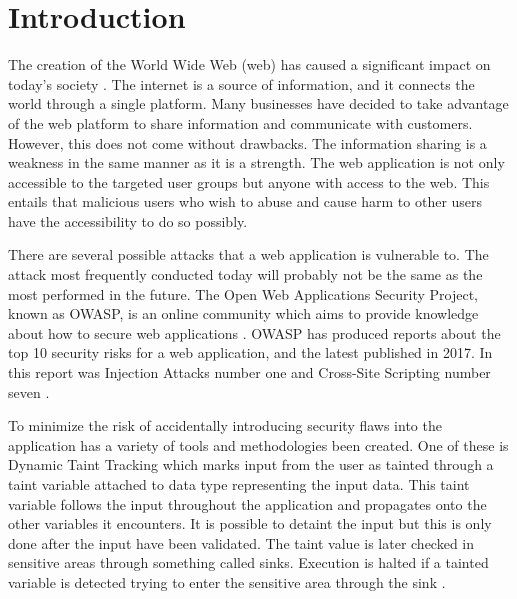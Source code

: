 \chapter{Introduction}
\label{Introduction}
The creation of the World Wide Web (web) has caused a significant impact on today's society \parencite{www}. The internet is a source of information, and it connects the world through a single platform. Many businesses have decided to take advantage of the web platform to share information and communicate with customers. However, this does not come without drawbacks. The information sharing is a weakness in the same manner as it is a strength. The web application is not only accessible to the targeted user groups but anyone with access to the web. This entails that malicious users who wish to abuse and cause harm to other users have the accessibility to do so possibly.

There are several possible attacks that a web application is vulnerable to. The attack most frequently conducted today will probably not be the same as the most performed in the future. The Open Web Applications Security Project, known as OWASP, is an online community which aims to provide knowledge about how to secure web applications \parencite{OpenWebApplicationSecurityProject}. OWASP has produced reports about the top 10 security risks for a web application, and the latest published in 2017. In this report was Injection Attacks number one and Cross-Site Scripting number seven \parencite{OWASP2017, OpenWebApplicationSecurityProject, CrossMichael2007Dgtw}.

To minimize the risk of accidentally introducing security flaws into the application has a variety of tools and methodologies been created. One of these is Dynamic Taint Tracking which marks input from the user as tainted through a taint variable attached to data type representing the input data. This taint variable follows the input throughout the application and propagates onto the other variables it encounters. It is possible to detaint the input but this is only done after the input have been validated. The taint value is later checked in sensitive areas through something called sinks. Execution is halted if a tainted variable is detected trying to enter the sensitive area through the sink \parencite{Pan2015, Venkataramani2008}. 

